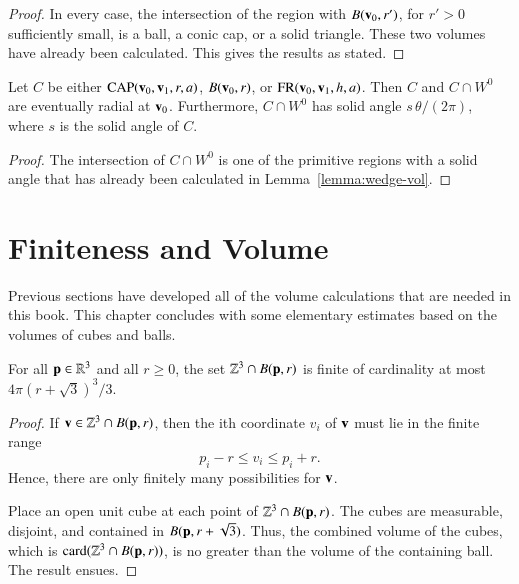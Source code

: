\begin{proof} In every case, the intersection of 
the region with $B({\mathbf v}_0,r')$, for $r'>0$ sufficiently small, is a ball,
a conic cap, or a solid triangle.  These two volumes have
already been calculated.  This gives the results as stated.
\end{proof}

\begin{lemma}\label{lemma:wedge-sol}  
Let $C$ be either ${\operatorname{CAP}}({\mathbf v}_0,{\mathbf v}_1,r,a)$, $B({\mathbf v}_0,r)$, or
${\operatorname{FR}}({\mathbf v}_0,{\mathbf v}_1,h,a)$.  Then $C$ and $C\cap W^0$ are eventually
radial at ${\mathbf v}_0$. Furthermore, $C\cap W^0$ has solid angle
$s\,\theta/(2\pi)$, where $s$ is the solid angle of $C$.
\end{lemma}

\begin{proof} The intersection of $C\cap W^0$ is one of the primitive
  regions with a solid angle that has already been calculated in
  Lemma~\ref{lemma:wedge-vol}.
\end{proof}

\section{Finiteness and Volume}\label{sec:finiteness}

Previous sections have developed all of the volume calculations that are
 needed in this book.  This chapter concludes with some 
elementary estimates based on the volumes of  cubes and balls.

\begin{lemma}[]
\label{lemma:Zcount}
For all ${\mathbf p}\in\mathbb{R}^3$ and all $r\ge 0$, the set
$\mathbb{Z}^3\cap B({\mathbf p},r)$ is finite of cardinality at most
$4\pi (r+\sqrt3)^3/3$.
%
\end{lemma}

\begin{proof}  If ${\mathbf v}\in\mathbb{Z}^3\cap B({\mathbf p},r)$, then the ith
coordinate $v_i$ of ${\mathbf v}$ must lie in the finite range
\[ 
p_i - r \le v_i \le p_i + r.
\] 
Hence, there are only finitely many possibilities for ${\mathbf v}$.


Place an open unit cube at each point of $\mathbb{Z}^3\cap B({\mathbf p},r)$.
The cubes are measurable, disjoint, and contained in
$B({\mathbf p},r+\sqrt3)$.  Thus, the combined volume of the cubes, which is
${\operatorname{card}}(\mathbb{Z}^3\cap B({\mathbf p},r))$,  is no greater than the volume of the
containing ball.  The result ensues.
\end{proof}

